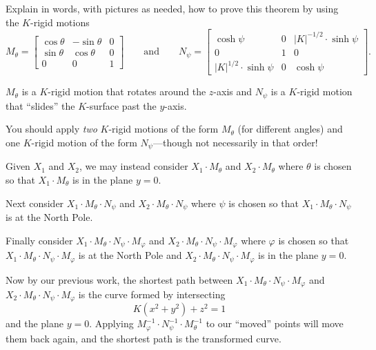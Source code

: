 \documentclass[newpage,hints,handout]{ximera}
\begin{document}
\begin{problem}
  Explain in words, with pictures as needed, how to prove this theorem
  by using the $K$-rigid motions
  \[
  M_\theta=
  \begin{bmatrix}
    \cos\theta & -\sin\theta & 0\\
    \sin\theta & \cos\theta & 0\\
    0 & 0 & 1
  \end{bmatrix}
  \qquad\text{and}\qquad
  N_\psi=
  \begin{bmatrix}
    \cosh\psi & 0 & |K|^{-1/2}\cdot\sinh\psi\\
    0 & 1 & 0\\
    |K|^{1/2}\cdot\sinh\psi & 0 & \cosh\psi
  \end{bmatrix}.
  \]
  \begin{hint}
    $M_\theta$ is a $K$-rigid motion that rotates around the $z$-axis and $N_\psi$
    is a $K$-rigid motion that ``slides'' the $K$-surface past the $y$-axis.
  \end{hint}
  \begin{hint}
    You should apply \textit{two} $K$-rigid motions of the form
    $M_\theta$ (for different angles) and one $K$-rigid motion of the
    form $N_\psi$---though not necessarily in that order!
  \end{hint}
  \begin{freeResponse}
    Given $X_1$ and $X_2$, we may instead consider $X_1\cdot M_\theta$
    and $X_2\cdot M_\theta$ where $\theta$ is chosen so that $X_1\cdot
    M_\theta$ is in the plane $y=0$.

    Next consider $X_1\cdot M_\theta\cdot N_\psi$ and $X_2\cdot
    M_\theta\cdot N_\psi$ where $\psi$ is chosen so that $X_1\cdot
    M_\theta\cdot N_\psi$ is at the North Pole.

    Finally consider $X_1\cdot M_\theta\cdot N_\psi\cdot M_\varphi$
    and $X_2\cdot M_\theta\cdot N_\psi\cdot M_\varphi$ where $\varphi$
    is chosen so that $X_1\cdot M_\theta\cdot N_\psi\cdot M_\varphi$
    is at the North Pole and $X_2\cdot M_\theta\cdot N_\psi\cdot
    M_\varphi$ is in the plane $y=0$.

    Now by our previous work, the shortest path between $X_1\cdot
    M_\theta\cdot N_\psi\cdot M_\varphi$ and $X_2\cdot M_\theta\cdot
    N_\psi\cdot M_\varphi$ is the curve formed by intersecting
    \[
    K(x^2+y^2)+z^2=1
    \]
    and the plane $y=0$. Applying $M_\varphi^{-1}\cdot
    N_\psi^{-1}\cdot M_\theta^{-1}$ to our ``moved'' points will move
    them back again, and the shortest path is the transformed curve.
  \end{freeResponse}
\end{problem}
\end{document}
